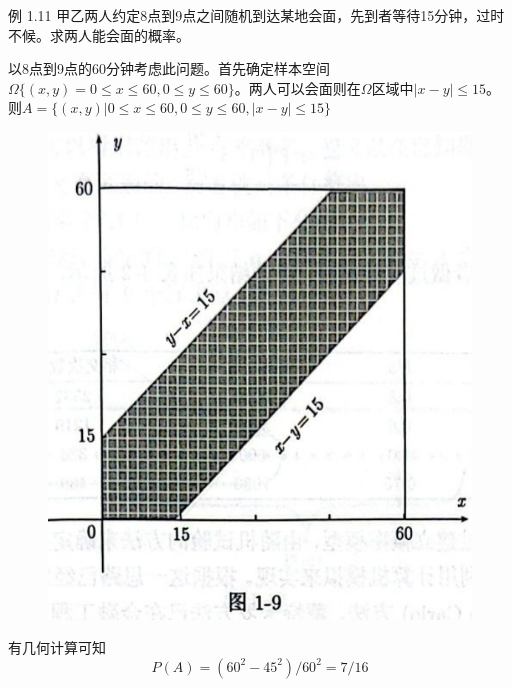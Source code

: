 \documentclass{beamer}
\begin{document}
	\begin{frame}
		例 1.11 甲乙两人约定8点到9点之间随机到达某地会面，先到者等待15分钟，过时不候。求两人能会面的概率。
		
		
		以8点到9点的60分钟考虑此问题。首先确定样本空间$\Omega\{(x, y) = 0 \leq x \leq 60, 0\leq y \leq 60\}$。两人可以会面则在$\Omega$区域中$|x - y| \leq 15$。则$A = \{(x, y) | 0 \leq x \leq 60, 0\leq y \leq 60, |x - y| \leq 15\}$
	\end{frame}
	
	\begin{frame}
		\begin{figure}
			\centering
			\includegraphics[scale = 0.4]{figures/figure1-9.png}
		\end{figure}
	\end{frame}
	
	\begin{frame}
		有几何计算可知
		\[
		P(A) = (60 ^ 2 - 45 ^ 2) / 60 ^ 2 = 7 / 16
		\]
	\end{frame}
	
\end{document}
